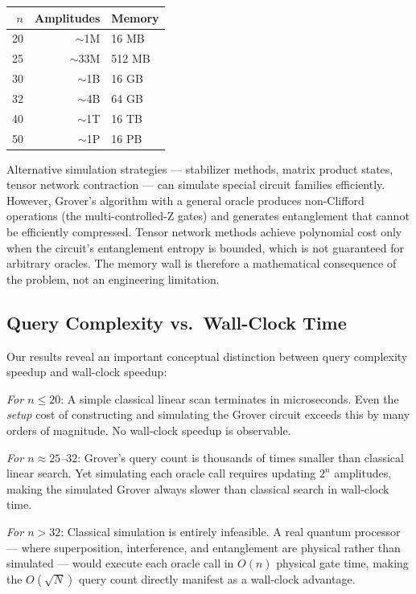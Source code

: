 \documentclass[sigconf, authorversion=true, nonacm=true]{acmart}
\begin{document}
\begin{center}
\begin{tabular}{rrl}
\toprule
$n$ & Amplitudes & Memory \\
\midrule
20 & $\sim$1M  & 16 MB \\
25 & $\sim$33M & 512 MB \\
30 & $\sim$1B  & 16 GB \\
32 & $\sim$4B  & 64 GB \\
40 & $\sim$1T  & 16 TB \\
50 & $\sim$1P  & 16 PB \\
\bottomrule
\end{tabular}
\end{center}

Alternative simulation strategies — stabilizer methods, matrix product states, tensor network contraction — can simulate special circuit families efficiently. However, Grover's algorithm with a general oracle produces non-Clifford operations (the multi-controlled-Z gates) and generates entanglement that cannot be efficiently compressed. Tensor network methods achieve polynomial cost only when the circuit's entanglement entropy is bounded, which is not guaranteed for arbitrary oracles. The memory wall is therefore a mathematical consequence of the problem, not an engineering limitation.

\subsection{Query Complexity vs.\ Wall-Clock Time}

Our results reveal an important conceptual distinction between query complexity speedup and wall-clock speedup:

\textit{For $n \leq 20$}: A simple classical linear scan terminates in microseconds. Even the \emph{setup} cost of constructing and simulating the Grover circuit exceeds this by many orders of magnitude. No wall-clock speedup is observable.

\textit{For $n \approx 25$--$32$}: Grover's query count is thousands of times smaller than classical linear search. Yet simulating each oracle call requires updating $2^n$ amplitudes, making the simulated Grover always slower than classical search in wall-clock time.

\textit{For $n > 32$}: Classical simulation is entirely infeasible. A real quantum processor — where superposition, interference, and entanglement are physical rather than simulated — would execute each oracle call in $O(n)$ physical gate time, making the $O(\sqrt{N})$ query count directly manifest as a wall-clock advantage.
\end{document}
